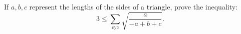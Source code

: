 If $ a,b,c $ represent the lengths of the sides of a triangle, prove the inequality:
$$ 3\le\sum_{\text{cyc}}\sqrt{\frac{a}{-a+b+c}} . $$
